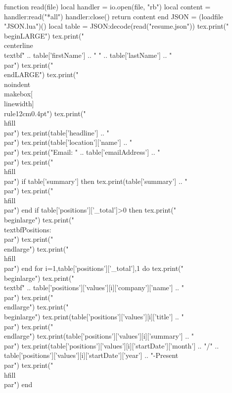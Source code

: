 \documentclass{article}
\begin{document}
\begin{luacode}
function read(file)
    local handler = io.open(file, "rb")
    local content = handler:read("*all")
    handler:close()
    return content
end
JSON = (loadfile "JSON.lua")()
local table = JSON:decode(read("resume.json"))
tex.print("\\begin{LARGE}")
tex.print("\\centerline {\\textbf{" .. table['firstName'] .. " " .. table['lastName'] .. "}}\\par")
tex.print("\\end{LARGE}")
tex.print("\\noindent\\makebox[\\linewidth]{\\rule{12cm}{0.4pt}}")
tex.print("\\hfill\\par")
tex.print(table['headline'] .. "\\par")
tex.print(table['location']['name'] .. "\\par")
tex.print("Email: " .. table['emailAddress'] .. "\\par")
tex.print("\\hfill\\par")
if table['summary'] then
  tex.print(table['summary'] .. "\\par")
  tex.print("\\hfill\\par")
end
if table['positions']['_total']>0 then
  tex.print("\\begin{large}")
  tex.print("\\textbf{Positions:}\\par")
  tex.print("\\end{large}")
  tex.print("\\hfill\\par")
end
for i=1,table['positions']['_total'],1 do
  tex.print("\\begin{large}")
  tex.print("\\textbf{" .. table['positions']['values'][i]['company']['name'] .. "}\\par")
  tex.print("\\end{large}")
  tex.print("\\begin{large}")
  tex.print(table['positions']['values'][i]['title'] .. "\\par")
  tex.print("\\end{large}")
  tex.print(table['positions']['values'][i]['summary'] .. "\\par")
  tex.print(table['positions']['values'][i]['startDate']['month'] .. "/" .. table['positions']['values'][i]['startDate']['year'] .. "-Present\\par")
  tex.print("\\hfill\\par")
end

\end{luacode}
\end{document}
